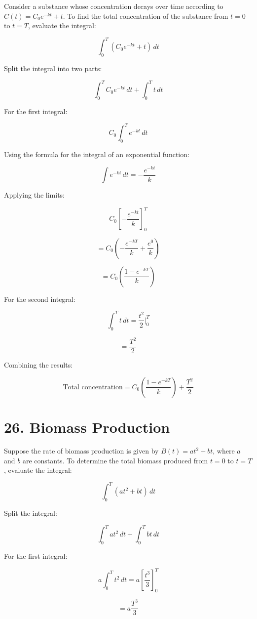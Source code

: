 \documentclass{article}
\begin{document}
Consider a substance whose concentration decays over time according to \( C(t) = C_0 e^{-kt} + t \). To find the total concentration of the substance from \( t = 0 \) to \( t = T \), evaluate the integral:

\[
\int_{0}^{T} \left( C_0 e^{-kt} + t \right) \, dt
\]

Split the integral into two parts:

\[
\int_{0}^{T} C_0 e^{-kt} \, dt + \int_{0}^{T} t \, dt
\]

For the first integral:

\[
C_0 \int_{0}^{T} e^{-kt} \, dt
\]

Using the formula for the integral of an exponential function:

\[
\int e^{-kt} \, dt = -\frac{e^{-kt}}{k}
\]

Applying the limits:

\[
C_0 \left[ -\frac{e^{-kt}}{k} \right]_{0}^{T}
\]

\[
= C_0 \left( -\frac{e^{-kT}}{k} + \frac{e^{0}}{k} \right)
\]

\[
= C_0 \left( \frac{1 - e^{-kT}}{k} \right)
\]

For the second integral:

\[
\int_{0}^{T} t \, dt = \frac{t^2}{2} \Big|_{0}^{T}
\]

\[
= \frac{T^2}{2}
\]

Combining the results:

\[
\text{Total concentration} = C_0 \left( \frac{1 - e^{-kT}}{k} \right) + \frac{T^2}{2}
\]

\section*{26. Biomass Production}

Suppose the rate of biomass production is given by \( B(t) = a t^2 + b t \), where \( a \) and \( b \) are constants. To determine the total biomass produced from \( t = 0 \) to \( t = T \), evaluate the integral:

\[
\int_{0}^{T} \left( a t^2 + b t \right) \, dt
\]

Split the integral:

\[
\int_{0}^{T} a t^2 \, dt + \int_{0}^{T} b t \, dt
\]

For the first integral:

\[
a \int_{0}^{T} t^2 \, dt = a \left[ \frac{t^3}{3} \right]_{0}^{T}
\]

\[
= a \frac{T^3}{3}
\]
\end{document}
